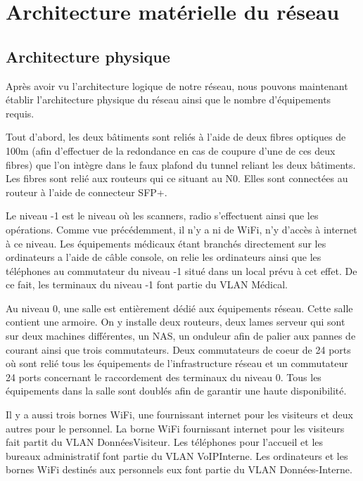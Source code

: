 \section{Architecture matérielle du réseau}

%
%
\subsection{Architecture physique}

Après avoir vu l'architecture logique de notre réseau, nous pouvons maintenant établir l'architecture physique du réseau ainsi que le nombre d'équipements requis.

Tout d'abord, les deux bâtiments sont reliés à l'aide de deux fibres optiques de 100m (afin d'effectuer de la redondance en cas de coupure d'une de ces deux fibres) que l'on intègre dans le faux plafond du tunnel reliant les deux bâtiments.
Les fibres sont relié aux routeurs qui ce situant au N0. Elles sont connectées au routeur à l'aide de connecteur SFP+.

Le niveau -1 est le niveau où les scanners, radio s'effectuent ainsi que les opérations. Comme vue précédemment, il n'y a ni de WiFi, n'y d'accès à internet à ce niveau.
Les équipements médicaux étant branchés directement sur les ordinateurs a l'aide de câble console, on relie les ordinateurs ainsi que les téléphones au commutateur du niveau -1 situé dans un local prévu à cet effet.
De ce fait, les terminaux du niveau -1 font partie du VLAN Médical.

Au niveau 0, une salle est entièrement dédié aux équipements réseau. Cette salle contient une armoire. On y installe deux routeurs, deux lames serveur qui sont sur deux machines différentes, un NAS, un onduleur afin de palier aux pannes de courant ainsi que trois commutateurs.
Deux commutateurs de coeur de 24 ports où sont relié tous les équipements de l'infrastructure réseau et un commutateur 24 ports concernant le raccordement des terminaux du niveau 0.
Tous les équipements dans la salle sont doublés afin de garantir une haute disponibilité.

Il y a aussi  trois bornes WiFi, une fournissant internet pour les visiteurs et deux autres pour le personnel.
La borne WiFi fournissant internet pour les visiteurs fait partit du VLAN DonnéesVisiteur.
Les téléphones pour l'accueil et les bureaux administratif font partie du VLAN VoIPInterne.
Les ordinateurs et les bornes WiFi destinés aux personnels eux font partie du VLAN Données-Interne.

